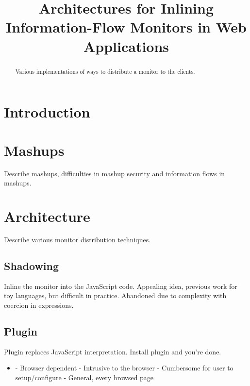 \documentclass{llncs}
\title{Architectures for Inlining Information-Flow Monitors in Web Applications}
\begin{document}
\maketitle



\begin{abstract}
Various implementations of ways to distribute a monitor to the clients.
\end{abstract}










\section{Introduction}
\label{sec:intro}

\section{Mashups}
\label{sec:mash}

Describe mashups, difficulties in mashup security and information flows in mashups.

\section{Architecture}
\label{sec:arch}

Describe various monitor distribution techniques.

\subsection{Shadowing}

Inline the monitor into the JavaScript code. Appealing idea, previous work for 
toy languages, but difficult in practice. Abandoned due to complexity with 
coercion in expressions.

\subsection{Plugin}

Plugin replaces JavaScript interpretation. Install plugin and you're done.
\begin{itemize}
\item- Browser dependent
- Intrusive to the browser
- Cumbersome for user to setup/configure
- General, every browsed page
\end{itemize}
\end{document}
